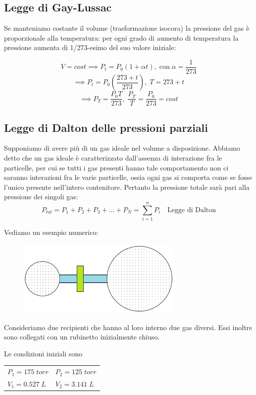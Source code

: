 \subsection{Legge di Gay-Lussac}
Se manteniamo costante il volume (trasformazione isocora) la pressione del gas è proporzionale alla temperatura: per ogni grado di aumento di temperatura la pressione aumenta di 1/273-esimo del suo valore iniziale:

$$V=cost \implies P_t=P_0(1 + \alpha t), \; \text{con} \; \alpha=\frac{1}{273}$$
$$\implies P_t=P_0 \left( \frac{273 + t}{273} \right), \; T=273 + t$$
$$\implies P_T = \frac{P_0 T}{273}, \; \frac{P_T}{T}=\frac{P_0}{273}=cost$$

\subsection{Legge di Dalton delle pressioni parziali}
Supponiamo di avere più di un gas ideale nel volume a disposizione. Abbiamo detto che un gas ideale è caratterizzato dall'assenza di interazione fra le particelle, per cui se tutti i gas presenti hanno tale comportamento non ci saranno interazioni fra le varie particelle, ossia ogni gas si comporta come se fosse l'unico presente nell'intero contenitore. Pertanto la pressione totale sarà pari alla pressione dei singoli gas:
$$P_{tot}=P_1 + P_2 + P_3 + \ldots + P_N = \sum_{i=1}^nP_i
\quad\text{Legge di Dalton}$$

Vediamo un esempio numerico:

\vspace{-0.3cm}
\hspace{0.5cm}\begin{minipage}{0.55 \textwidth}
    \begin{figure}[H]
        \includegraphics[width=8cm]{immagini/serbatoio.png}
    \end{figure}
\end{minipage}
\begin{minipage}{0.4 \textwidth}
\vspace{0.8cm}Consideriamo due recipienti che hanno al loro interno due gas diversi. Essi inoltre sono collegati con un rubinetto inizialmente chiuso.

Le condizioni iniziali sono

\begin{center}
    \begin{tabular}{p{2.5cm}p{2.5cm}}
        $P_1=175 \; torr$ & $P_2=125 \; torr$\\[1ex]
        $V_1=0.527 \; L$ & $V_2=3.141 \; L$
    \end{tabular}
\end{center}
\end{minipage}

